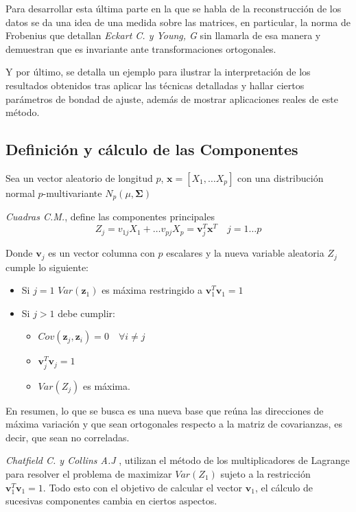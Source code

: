 \noindent Para desarrollar esta última parte en la que se habla de la reconstrucción de los datos se da una idea de una medida sobre las matrices, en particular, la norma de Frobenius que detallan \emph{Eckart C. y Young, G }\cite{Eckart 1936} sin llamarla de esa manera y demuestran que es invariante ante transformaciones ortogonales.

\noindent Y por último, se detalla un ejemplo para ilustrar la interpretación de los resultados obtenidos tras aplicar las técnicas detalladas y hallar ciertos parámetros de bondad de ajuste, además de mostrar  aplicaciones reales de este método. 

\newpage
\subsection{Definición y cálculo de las Componentes}

\noindent Sea un vector aleatorio de longitud $p$, $\mathbf{x}=[X_1,\ldots X_p]$ con una distribución normal $p$-multivariante $N_p(\mu,\mathbf{\Sigma})$
\begin{defi}
\emph{Cuadras C.M.},\cite{Cuadras 2014} define las componentes principales 
\begin{equation}
Z_j=v_{1j}X_1+\ldots v_{pj}X_p=\mathbf{v}_j^T\mathbf{x}^T \quad j=1\ldots p
\end{equation}

\noindent Donde $\textbf{v}_j$ es un vector columna con $p$ escalares y la nueva variable aleatoria $Z_j$ cumple lo siguiente:
\begin{itemize}
\item Si $j=1$ $Var(\mathbf{z}_1)$ es máxima restringido a $\mathbf{v}_1^T \mathbf{v}_1=1$
\item Si $j>1$ debe cumplir:
\begin{itemize}
\item $Cov(\textbf{z}_j,\textbf{z}_i)=0\quad \forall i\neq j $
\item $\textbf{v}_j^T \textbf{v}_j=1$
\item $Var(Z_j)$ es máxima. 
\end{itemize}
\end{itemize}
\noindent En resumen, lo que se busca es una nueva base que reúna las direcciones de máxima variación y que sean ortogonales respecto a la matriz de covarianzas, es decir, que sean no correladas.
\end{defi}

\noindent \emph{Chatfield C. y Collins A.J} \cite{Chatfield 1989}, utilizan el método de los multiplicadores de Lagrange para resolver el problema de maximizar  $Var(Z_1)$ sujeto a la restricción $\textbf{v}_1^T\textbf{v}_1=1$. Todo esto con el objetivo de calcular el vector $\mathbf{v}_1$, el cálculo de sucesivas componentes cambia en ciertos aspectos. 


